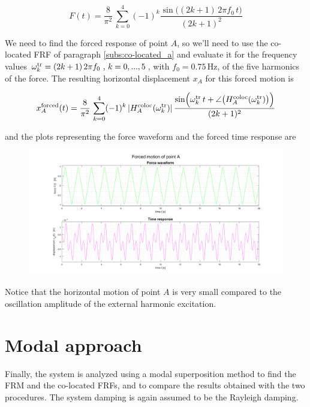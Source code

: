 \documentclass[a4paper,12pt,oneside]{article}
\begin{document}
\[
	F(t) = \frac{8}{\pi^2} \, \sum_{k=0}^4 (-1)^k
		\frac{\sin\bigl((2k + 1) \, 2 \pi f_0 \, t\bigr)}{(2k + 1)^2}
\]

We need to find the forced response of point $ A $, so we'll need to use the co-located FRF of paragraph \ref{subs:co-located_a} and evaluate it for the frequency values $ \omega^\textup{tr}_k = (2k + 1) \, 2 \pi f_0 \text{ , } k = 0,...,5 $, with $ f_0 = 0.75 \, \text{Hz} $, of the five harmonics of the force. The resulting horizontal displacement $ x_A $ for this forced motion is

\[
	x_A^\textup{forced}(t) = \frac{8}{\pi^2} \, \sum_{k=0}^4 (-1)^k \,
		|H^\textup{coloc}_A(\omega^\textup{tr}_k)| \,
		\frac{\sin\Bigl(\omega^\textup{tr}_k \, t +
		\angle\bigl(H^\textup{coloc}_A(\omega^\textup{tr}_k)\bigr)\Bigr)}{(2k + 1)^2}
\]

and the plots representing the force waveform and the forced time response are

\begin{figure}[h]
	\hspace{-70pt}
	\includegraphics[scale=0.4]{forced_motion}
\end{figure}

Notice that the horizontal motion of point $ A $ is very small compared to the oscillation amplitude of the external harmonic excitation.

\vspace{30pt}


\section{Modal approach}

Finally, the system is analyzed using a modal superposition method to find the FRM and the co-located FRFs, and to compare the results obtained with the two procedures. The system damping is again assumed to be the Rayleigh damping.
\end{document}
